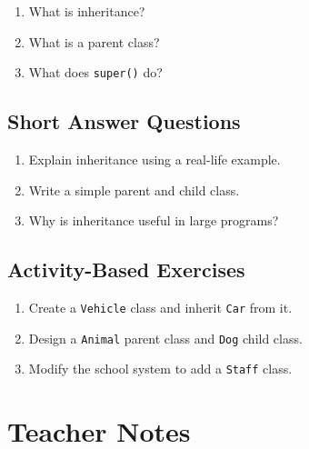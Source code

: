 \begin{enumerate}
    \item What is inheritance?
    \item What is a parent class?
    \item What does \texttt{super()} do?
\end{enumerate}

\subsection{Short Answer Questions}

\begin{enumerate}
    \item Explain inheritance using a real-life example.
    \item Write a simple parent and child class.
    \item Why is inheritance useful in large programs?
\end{enumerate}

\subsection{Activity-Based Exercises}

\begin{enumerate}
    \item Create a \texttt{Vehicle} class and inherit \texttt{Car} from it.
    \item Design a \texttt{Animal} parent class and \texttt{Dog} child class.
    \item Modify the school system to add a \texttt{Staff} class.
\end{enumerate}

\section{Teacher Notes}


